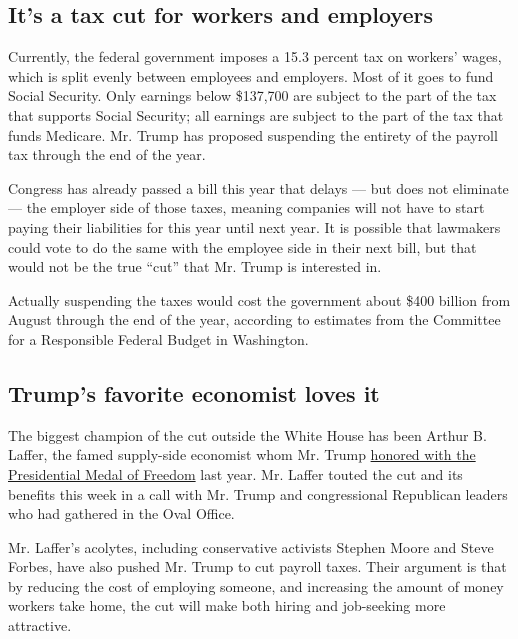 \hypertarget{its-a-tax-cut-for-workers-and-employers}{%
\subsection{It's a tax cut for workers and
employers}\label{its-a-tax-cut-for-workers-and-employers}}

Currently, the federal government imposes a 15.3 percent tax on workers'
wages, which is split evenly between employees and employers. Most of it
goes to fund Social Security. Only earnings below \$137,700 are subject
to the part of the tax that supports Social Security; all earnings are
subject to the part of the tax that funds Medicare. Mr. Trump has
proposed suspending the entirety of the payroll tax through the end of
the year.

Congress has already passed a bill this year that delays --- but does
not eliminate --- the employer side of those taxes, meaning companies
will not have to start paying their liabilities for this year until next
year. It is possible that lawmakers could vote to do the same with the
employee side in their next bill, but that would not be the true ``cut''
that Mr. Trump is interested in.

Actually suspending the taxes would cost the government about \$400
billion from August through the end of the year, according to estimates
from the Committee for a Responsible Federal Budget in Washington.

\hypertarget{trumps-favorite-economist-loves-it}{%
\subsection{Trump's favorite economist loves
it}\label{trumps-favorite-economist-loves-it}}

The biggest champion of the cut outside the White House has been Arthur
B. Laffer, the famed supply-side economist whom Mr. Trump
\href{https://www.nytimes3xbfgragh.onion/2019/06/19/us/politics/arthur-laffer-medal-of-freedom.html}{honored
with the Presidential Medal of Freedom} last year. Mr. Laffer touted the
cut and its benefits this week in a call with Mr. Trump and
congressional Republican leaders who had gathered in the Oval Office.

Mr. Laffer's acolytes, including conservative activists Stephen Moore
and Steve Forbes, have also pushed Mr. Trump to cut payroll taxes. Their
argument is that by reducing the cost of employing someone, and
increasing the amount of money workers take home, the cut will make both
hiring and job-seeking more attractive.

